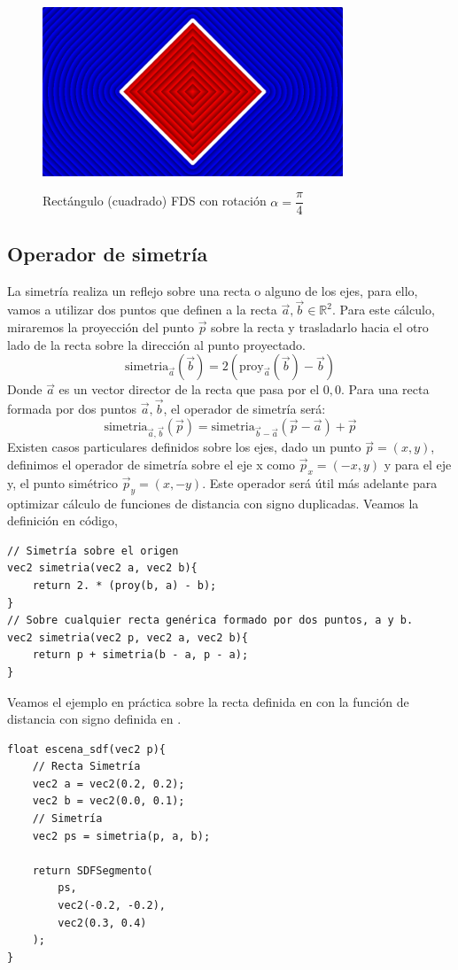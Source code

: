 \begin{figure}[H]
  \centering
  \captionsetup{justification=centering}%
  \includegraphics[width=0.8\textwidth]{secciones/imagenes/sdf/2d/sdf_rotacion.png}\label{fig:rotacion}
  \caption{Rectángulo (cuadrado) FDS con rotación \(\alpha=\dfrac{\pi}{4}\)}
\end{figure}

\subsection{Operador de simetría}
La simetría realiza un reflejo sobre una recta o alguno de los ejes, para ello, vamos a utilizar dos puntos que definen a la recta \(\Vec{a}, \Vec{b}\in\mathbb{R}^2\).
Para este cálculo, miraremos la proyección del punto \(\Vec{p}\) sobre la recta y trasladarlo hacia el otro lado de la recta sobre la dirección al punto proyectado.
\[\text{simetria}_{\Vec{a}}(\Vec{b})=2(\text{proy}_{\Vec{a}}(\Vec{b})-\Vec{b})\]
Donde \(\Vec{a}\) es un vector director de la recta que pasa por el \(0,0\). Para una recta formada por dos puntos \(\Vec{a}, \Vec{b}\), el operador de simetría será:
\[\text{simetria}_{\Vec{a},\Vec{b}}(\Vec{p}) = \text{simetria}_{\Vec{b}-\Vec{a}}(\Vec{p}-\Vec{a})+\Vec{p}\]
Existen casos particulares definidos sobre los ejes, dado un punto \(\Vec{p}=(x,y)\), definimos el operador de simetría sobre el eje x como \(\Vec{p}_x=(-x,y)\) y para el eje y, el punto simétrico \(\Vec{p}_y=(x,-y)\). Este operador será útil más adelante para optimizar cálculo de funciones de distancia con signo duplicadas.
\newpage
Veamos la definición en código,
\begin{lstlisting}
// Simetría sobre el origen
vec2 simetria(vec2 a, vec2 b){    
    return 2. * (proy(b, a) - b);
}
// Sobre cualquier recta genérica formado por dos puntos, a y b.
vec2 simetria(vec2 p, vec2 a, vec2 b){    
    return p + simetria(b - a, p - a);
}
\end{lstlisting}
Veamos el ejemplo en práctica sobre la recta definida en  con la función de distancia con signo definida en .
\begin{lstlisting}
float escena_sdf(vec2 p){
    // Recta Simetría
    vec2 a = vec2(0.2, 0.2);
    vec2 b = vec2(0.0, 0.1);
    // Simetría
    vec2 ps = simetria(p, a, b);
    
    return SDFSegmento(
        ps,
        vec2(-0.2, -0.2), 
        vec2(0.3, 0.4)
    );
}
\end{lstlisting}

